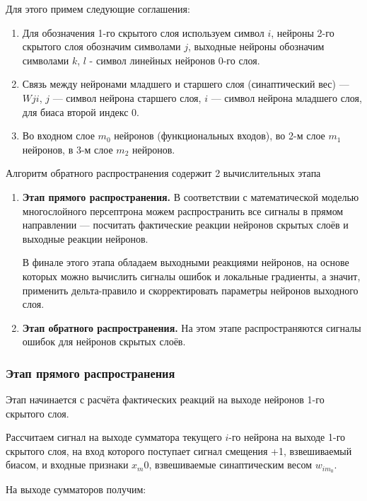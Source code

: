 \documentclass[a4paper]{article}
\numberwithin{equation}{subsection}
\begin{document}
Для этого примем следующие соглашения:
\begin{enumerate}
    \item Для обозначения 1-го скрытого слоя используем символ $i$, нейроны 2-го скрытого слоя 
    обозначим символами $j$, выходные нейроны обозначим символами $k$, $l$ - символ линейных 
    нейронов 0-го слоя.
    \item Связь между нейронами младшего и старшего слоя (синаптический вес) --- $W{ji}$, 
    $j$ --- символ нейрона старшего слоя, $i$ --- символ нейрона младшего слоя, 
    для биаса второй индекс $0$.
    \item Во входном слое $m_0$ нейронов (функциональных входов), во 2-м слое 
    $m_1$ нейронов, в 3-м слое $m_2$ нейронов.
\end{enumerate}

Алгоритм обратного распространения содержит 2 вычислительных этапа
\begin{enumerate}
    \item \textbf{Этап прямого распространения.} В соответствии с математической моделью многослойного 
    персептрона можем распространить все сигналы в прямом направлении --- посчитать фактические 
    реакции нейронов скрытых слоёв и выходные реакции нейронов. 
    
    В финале этого этапа обладаем выходными реакциями нейронов, на основе которых можно 
    вычислить сигналы ошибок и локальные градиенты, а значит, применить дельта-правило 
    и скорректировать параметры нейронов выходного слоя.
    \item \textbf{Этап обратного распространения.} 
    На этом этапе распространяются сигналы ошибок для нейронов скрытых слоёв.
\end{enumerate}



\subsubsection{Этап прямого распространения}

Этап начинается с расчёта фактических реакций на выходе нейронов 1-го скрытого слоя. 

Рассчитаем сигнал на выходе сумматора текущего $i$-го нейрона на выходе 1-го скрытого слоя, 
на вход которого  поступает сигнал смещения \glqq +1\grqq, взвешиваемый биасом, и входные признаки 
$x_m0$, взвешиваемые синаптическим весом $w_{im_0}$.

На выходе сумматоров получим:
\end{document}
